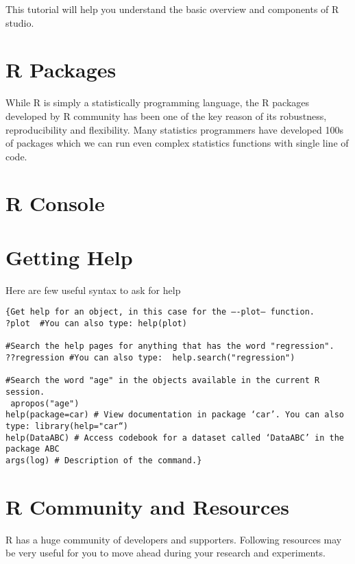 \documentclass[
]{book}
\begin{document}
This tutorial will help you understand the basic overview and components of R studio.

\hypertarget{r-packages}{%
\section{R Packages}\label{r-packages}}

While R is simply a statistically programming language, the R packages developed by R community has been one of the key reason of its robustness, reproducibility and flexibility. Many statistics programmers have developed 100s of packages which we can run even complex statistics functions with single line of code.

\hypertarget{r-console}{%
\section{R Console}\label{r-console}}

\hypertarget{getting-help}{%
\section{Getting Help}\label{getting-help}}

Here are few useful syntax to ask for help

\begin{verbatim}
{Get help for an object, in this case for the –-plot– function. 
?plot  #You can also type: help(plot)

#Search the help pages for anything that has the word "regression". 
??regression #You can also type:  help.search("regression")

#Search the word "age" in the objects available in the current R session.
 apropos("age")
help(package=car) # View documentation in package ‘car’. You can also type: library(help="car“)
help(DataABC) # Access codebook for a dataset called ‘DataABC’ in the package ABC
args(log) # Description of the command.}
\end{verbatim}

\hypertarget{r-community-and-resources}{%
\section{R Community and Resources}\label{r-community-and-resources}}

R has a huge community of developers and supporters. Following resources may be very useful for you to move ahead during your research and experiments.
\end{document}
